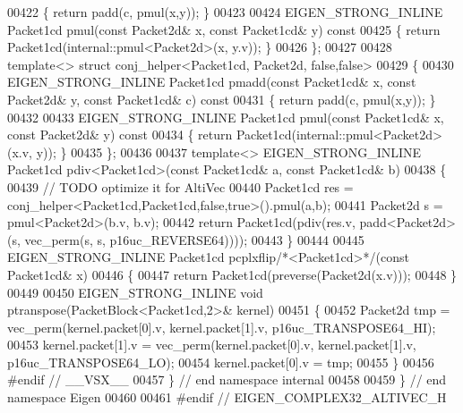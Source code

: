 \begin{DoxyCode}
00422 \textcolor{keyword}{  }\{ \textcolor{keywordflow}{return} padd(c, pmul(x,y)); \}
00423 
00424   EIGEN\_STRONG\_INLINE Packet1cd pmul(\textcolor{keyword}{const} Packet2d& x, \textcolor{keyword}{const} Packet1cd& y)\textcolor{keyword}{ const}
00425 \textcolor{keyword}{  }\{ \textcolor{keywordflow}{return} Packet1cd(internal::pmul<Packet2d>(x, y.v)); \}
00426 \};
00427 
00428 \textcolor{keyword}{template}<> \textcolor{keyword}{struct }conj\_helper<Packet1cd, Packet2d, false,false>
00429 \{
00430   EIGEN\_STRONG\_INLINE Packet1cd pmadd(\textcolor{keyword}{const} Packet1cd& x, \textcolor{keyword}{const} Packet2d& y, \textcolor{keyword}{const} Packet1cd& c)\textcolor{keyword}{ const}
00431 \textcolor{keyword}{  }\{ \textcolor{keywordflow}{return} padd(c, pmul(x,y)); \}
00432 
00433   EIGEN\_STRONG\_INLINE Packet1cd pmul(\textcolor{keyword}{const} Packet1cd& x, \textcolor{keyword}{const} Packet2d& y)\textcolor{keyword}{ const}
00434 \textcolor{keyword}{  }\{ \textcolor{keywordflow}{return} Packet1cd(internal::pmul<Packet2d>(x.v, y)); \}
00435 \};
00436 
00437 \textcolor{keyword}{template}<> EIGEN\_STRONG\_INLINE Packet1cd pdiv<Packet1cd>(\textcolor{keyword}{const} Packet1cd& a, \textcolor{keyword}{const} Packet1cd& b)
00438 \{
00439   \textcolor{comment}{// TODO optimize it for AltiVec}
00440   Packet1cd res = conj\_helper<Packet1cd,Packet1cd,false,true>().pmul(a,b);
00441   Packet2d s = pmul<Packet2d>(b.v, b.v);
00442   \textcolor{keywordflow}{return} Packet1cd(pdiv(res.v, padd<Packet2d>(s, vec\_perm(s, s, p16uc\_REVERSE64))));
00443 \}
00444 
00445 EIGEN\_STRONG\_INLINE Packet1cd pcplxflip\textcolor{comment}{/*<Packet1cd>*/}(\textcolor{keyword}{const} Packet1cd& x)
00446 \{
00447   \textcolor{keywordflow}{return} Packet1cd(preverse(Packet2d(x.v)));
00448 \}
00449 
00450 EIGEN\_STRONG\_INLINE \textcolor{keywordtype}{void} ptranspose(PacketBlock<Packet1cd,2>& kernel)
00451 \{
00452   Packet2d tmp = vec\_perm(kernel.packet[0].v, kernel.packet[1].v, p16uc\_TRANSPOSE64\_HI);
00453   kernel.packet[1].v = vec\_perm(kernel.packet[0].v, kernel.packet[1].v, p16uc\_TRANSPOSE64\_LO);
00454   kernel.packet[0].v = tmp;
00455 \}
00456 \textcolor{preprocessor}{#endif // \_\_VSX\_\_}
00457 \} \textcolor{comment}{// end namespace internal}
00458 
00459 \} \textcolor{comment}{// end namespace Eigen}
00460 
00461 \textcolor{preprocessor}{#endif // EIGEN\_COMPLEX32\_ALTIVEC\_H}
\end{DoxyCode}
